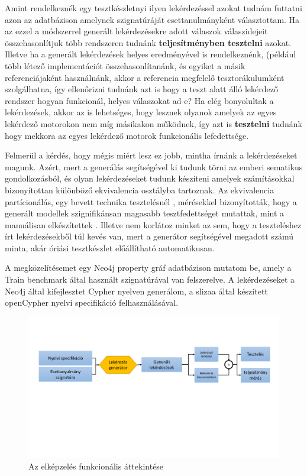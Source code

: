 Amint rendelkeznék egy tesztkészletnyi ilyen lekérdezéssel azokat tudnám futtatni azon az adatbázison amelynek szignatúráját esettanulmányként választottam. Ha az ezzel a módszerrel generált lekérdezésekre adott válaszok válaszidejeit összehasonlítjuk több rendszeren tudnánk \textbf{teljesítményben tesztelni} azokat. Illetve ha a generált lekérdezések helyes eredményével is rendelkeznénk, (például több létező implementációt összehasonlítanánk, és egyiket a másik referenciájaként használnánk, akkor a referencia  megfelelő tesztorákulumként szolgálhatna, így ellenőrizni tudnánk azt is hogy a teszt alatt álló lekérdező rendszer hogyan funkcionál, helyes válaszokat ad-e? Ha elég bonyolultak a lekérdezések, akkor az is lehetséges, hogy lesznek olyanok amelyek az egyes lekérdező motorokon nem míg másikakon működnek, így azt is \textbf{tesztelni} tudnánk hogy mekkora az egyes lekérdező motorok funkcionális lefedettsége.
    
Felmerül a kérdés, hogy mégis miért lesz ez jobb, mintha írnánk a lekérdezéseket magunk. Azért, mert a generálás segítségével ki tudunk törni az emberi sematikus gondolkozásból, és olyan lekérdezéseket tudunk készíteni amelyek számításokkal bizonyítottan különböző ekvivalencia osztályba tartoznak. Az ekvivalencia partícionálás, egy bevett  technika tesztelésnél \cite{burnstein2006practical}, mérésekkel bizonyították, hogy a generált modellek szignifikánsan magasabb tesztfedettséget mutattak, mint a manuálisan elkészítettek \cite{semerath2018iterative}. Illetve nem korlátoz minket az sem, hogy a teszteléshez írt lekérdezésekből túl kevés van, mert a generátor segítségével megadott számú minta, akár óriási tesztkészlet előállítható automatikusan.

A megközelítésemet egy Neo4j \cite{neo4j} property gráf adatbázison mutatom be, amely a Train benchmark \cite{szarnyas2018train} által használt szignatúrával van felszerelve. A  lekérdezéseket a Neo4j által kifejlesztet Cypher \cite{Cypher} nyelven generálom, a slizaa \cite{slizaa_2018} által készített openCypher nyelvi specifikáció felhasználásával. 


\begin{figure}
	\centering
	\includegraphics[width=1.0\textwidth]{figures/funkcionalisAttekintes}
	\caption{Az elképzelés funkcionális áttekintése}
	\label{fig:funkcionalisAttekintes}
\end{figure}
 
